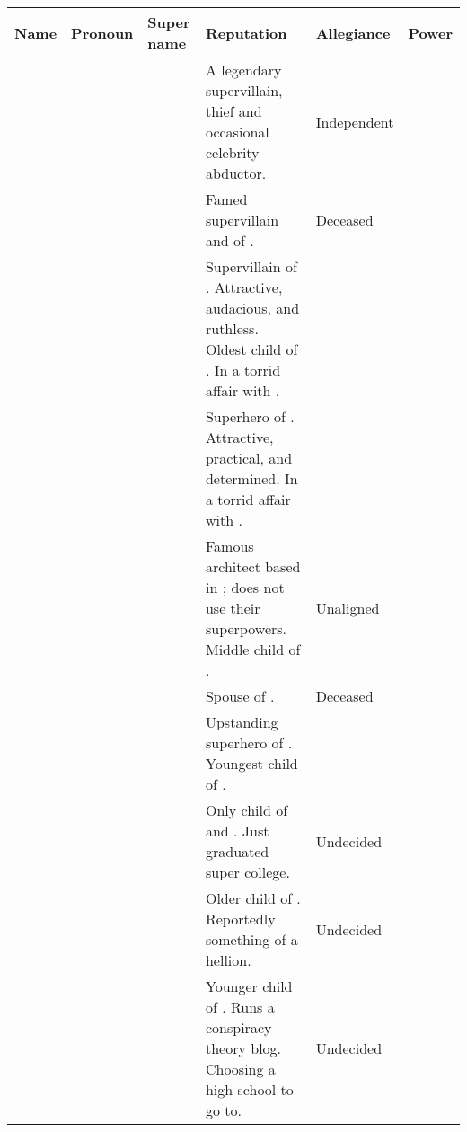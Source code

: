 \documentclass[blue]{LRSguildcamp1}
\begin{document}
\name{\bSuperFamily{}}


\begin{tabularx}{\textwidth}{l|l|l|X|X|X}
{\bf Name} & {\bf Pronoun} & {\bf Super name} & {\bf Reputation} & {\bf Allegiance} & {\bf Power} \\ \hline
\cGrandma{\intro} & \cGrandma{\they} & \cGrandma{\MYsupername} & A legendary supervillain, thief and occasional celebrity abductor. & Independent \cGrandma{\villain} & 
\cGrandma{\MYsuperpower} \\ \hline
\cGS{\intro} & \cGS{\they} & \cGS{\MYsupername} & Famed supervillain and \cGS{\spouse} of \cGrandma{}.  & Deceased \cGS{\villain} & \cGS{\MYsuperpower} \\ \hline
\cOldest{\intro} & \cOldest{\they} & \cOldest{\MYsupername} & Supervillain of \pCityO{}. Attractive, audacious, and ruthless.  Oldest child of \cGrandma{\intro}. In a torrid affair with \cOS{}. & \pVillainCompact{} & \cOldest{\MYsuperpower} \\ \hline
\cOS{\intro} & \cOS{\they} & \cOS{\MYsupername} &  Superhero of \pCityO{}.  Attractive, practical, and determined.  In a torrid affair with \cOldest{}. & \pLeagueOfHeroes{} & \cOS{\MYsuperpower} \\ \hline
\cArchitect{\intro} & \cArchitect{\they} & \cArchitect{\MYsupername} & Famous architect based in \pCityArchitect{}; does not use their superpowers.  Middle child of \cGrandma{\intro}. & Unaligned & \cArchitect{\MYsuperpower} \\ \hline
\cAS{\intro} & \cAS{\they} & \cAS{\MYsupername} & Spouse of \cArchitect{}.  & Deceased \cAS{\hero} & \cAS{\MYsuperpower} \\ \hline
\cYoungest{\intro} & \cYoungest{\they} & \cYoungest{\MYsupername} & Upstanding superhero of \pCityYoungest{}.  Youngest child of \cGrandma{}. & \pLeagueOfHeroes{} & \cYoungest{\MYsuperpower} \\ \hline
\cGrad{\intro} & \cGrad{\they} & \cGrad{\MYsupername} & Only child of \cOldest{} and \cOS{}.  Just graduated super college. & Undecided & \cGrad{\MYsuperpower} \\ \hline
\cTeen{\intro} & \cTeen{\they} & \cTeen{\MYsupername} & Older child of \cArchitect{}.  Reportedly something of a hellion. & Undecided & \cTeen{\MYsuperpower} \\ \hline
\cTween{\intro} & \cTween{\they} & \cTween{\MYsupername} & Younger child of \cArchitect{}. Runs a conspiracy theory blog.  Choosing a high school to go to. & Undecided & \cTween{\MYsuperpower} \\ \hline
\end{tabularx}
\end{document}
